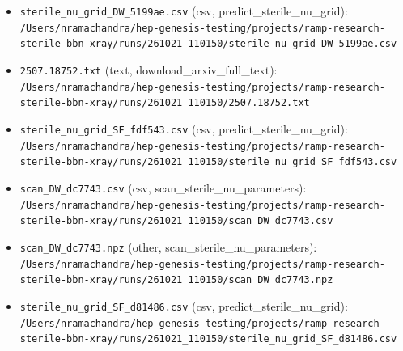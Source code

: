 \documentclass[11pt,a4paper]{article}
\begin{document}
\begin{itemize}
  \item \texttt{sterile\_\allowbreak{}nu\_\allowbreak{}grid\_\allowbreak{}DW\_\allowbreak{}5199ae.csv} (csv, predict\_sterile\_nu\_grid): \texttt{/\allowbreak{}Users/\allowbreak{}nramachandra/\allowbreak{}hep-genesis-testing/\allowbreak{}projects/\allowbreak{}ramp-research-sterile-bbn-xray/\allowbreak{}runs/\allowbreak{}261021\_\allowbreak{}110150/\allowbreak{}sterile\_\allowbreak{}nu\_\allowbreak{}grid\_\allowbreak{}DW\_\allowbreak{}5199ae.csv}
  \item \texttt{2507.18752.txt} (text, download\_arxiv\_full\_text): \texttt{/\allowbreak{}Users/\allowbreak{}nramachandra/\allowbreak{}hep-genesis-testing/\allowbreak{}projects/\allowbreak{}ramp-research-sterile-bbn-xray/\allowbreak{}runs/\allowbreak{}261021\_\allowbreak{}110150/\allowbreak{}2507.18752.txt}
  \item \texttt{sterile\_\allowbreak{}nu\_\allowbreak{}grid\_\allowbreak{}SF\_\allowbreak{}fdf543.csv} (csv, predict\_sterile\_nu\_grid): \texttt{/\allowbreak{}Users/\allowbreak{}nramachandra/\allowbreak{}hep-genesis-testing/\allowbreak{}projects/\allowbreak{}ramp-research-sterile-bbn-xray/\allowbreak{}runs/\allowbreak{}261021\_\allowbreak{}110150/\allowbreak{}sterile\_\allowbreak{}nu\_\allowbreak{}grid\_\allowbreak{}SF\_\allowbreak{}fdf543.csv}
  \item \texttt{scan\_\allowbreak{}DW\_\allowbreak{}dc7743.csv} (csv, scan\_sterile\_nu\_parameters): \texttt{/\allowbreak{}Users/\allowbreak{}nramachandra/\allowbreak{}hep-genesis-testing/\allowbreak{}projects/\allowbreak{}ramp-research-sterile-bbn-xray/\allowbreak{}runs/\allowbreak{}261021\_\allowbreak{}110150/\allowbreak{}scan\_\allowbreak{}DW\_\allowbreak{}dc7743.csv}
  \item \texttt{scan\_\allowbreak{}DW\_\allowbreak{}dc7743.npz} (other, scan\_sterile\_nu\_parameters): \texttt{/\allowbreak{}Users/\allowbreak{}nramachandra/\allowbreak{}hep-genesis-testing/\allowbreak{}projects/\allowbreak{}ramp-research-sterile-bbn-xray/\allowbreak{}runs/\allowbreak{}261021\_\allowbreak{}110150/\allowbreak{}scan\_\allowbreak{}DW\_\allowbreak{}dc7743.npz}
  \item \texttt{sterile\_\allowbreak{}nu\_\allowbreak{}grid\_\allowbreak{}SF\_\allowbreak{}d81486.csv} (csv, predict\_sterile\_nu\_grid): \texttt{/\allowbreak{}Users/\allowbreak{}nramachandra/\allowbreak{}hep-genesis-testing/\allowbreak{}projects/\allowbreak{}ramp-research-sterile-bbn-xray/\allowbreak{}runs/\allowbreak{}261021\_\allowbreak{}110150/\allowbreak{}sterile\_\allowbreak{}nu\_\allowbreak{}grid\_\allowbreak{}SF\_\allowbreak{}d81486.csv}

\end{itemize}
\end{document}
